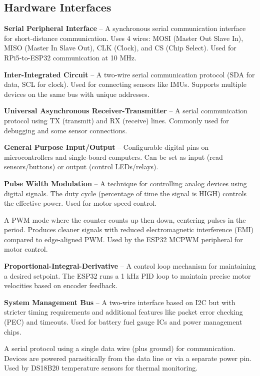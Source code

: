 \documentclass[11pt,letterpaper]{article}
\begin{document}
\subsection{Hardware Interfaces}

\begin{description}[style=nextline, leftmargin=2cm]
    \item[SPI] \textbf{Serial Peripheral Interface} -- A synchronous serial communication interface for short-distance communication. Uses 4 wires: MOSI (Master Out Slave In), MISO (Master In Slave Out), CLK (Clock), and CS (Chip Select). Used for RPi5-to-ESP32 communication at 10 MHz.

    \item[I2C] \textbf{Inter-Integrated Circuit} -- A two-wire serial communication protocol (SDA for data, SCL for clock). Used for connecting sensors like IMUs. Supports multiple devices on the same bus with unique addresses.

    \item[UART] \textbf{Universal Asynchronous Receiver-Transmitter} -- A serial communication protocol using TX (transmit) and RX (receive) lines. Commonly used for debugging and some sensor connections.

    \item[GPIO] \textbf{General Purpose Input/Output} -- Configurable digital pins on microcontrollers and single-board computers. Can be set as input (read sensors/buttons) or output (control LEDs/relays).

    \item[PWM] \textbf{Pulse Width Modulation} -- A technique for controlling analog devices using digital signals. The duty cycle (percentage of time the signal is HIGH) controls the effective power. Used for motor speed control.

    \item[Center-Aligned PWM] A PWM mode where the counter counts up then down, centering pulses in the period. Produces cleaner signals with reduced electromagnetic interference (EMI) compared to edge-aligned PWM. Used by the ESP32 MCPWM peripheral for motor control.

    \item[PID] \textbf{Proportional-Integral-Derivative} -- A control loop mechanism for maintaining a desired setpoint. The ESP32 runs a 1 kHz PID loop to maintain precise motor velocities based on encoder feedback.

    \item[SMBus] \textbf{System Management Bus} -- A two-wire interface based on I2C but with stricter timing requirements and additional features like packet error checking (PEC) and timeouts. Used for battery fuel gauge ICs and power management chips.

    \item[1-Wire] A serial protocol using a single data wire (plus ground) for communication. Devices are powered parasitically from the data line or via a separate power pin. Used by DS18B20 temperature sensors for thermal monitoring.
\end{description}
\end{document}
